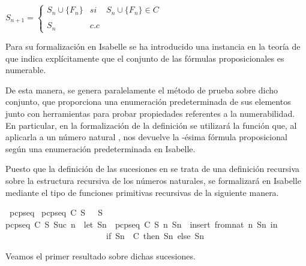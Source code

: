 \begin{isabellebody}
\begin{isamarkuptext}
\begin{definicion}
  $S_{n+1} = \left\{ \begin{array}{lcc} S_{n} \cup \{F_{n}\} &  si  & S_{n} \cup \{F_{n}\} \in C \\ \\ S_{n} & c.c \end{array} \right.$ 
\end{definicion}

  Para su formalización en Isabelle se ha introducido una instancia en la teoría de  que 
  indica explícitamente que el conjunto de las fórmulas proposicionales es numerable.


  De esta manera, se genera paralelamente el método de prueba  sobre dicho 
  conjunto, que proporciona una enumeración predeterminada de sus elementos junto con herramientas 
  para probar propiedades referentes a la numerabilidad. En particular, en la formalización de la
  definición  se utilizará la función  que, al aplicarla a un número natural , 
  nos devuelve la -ésima fórmula proposicional según una enumeración predeterminada en Isabelle. 

  Puesto que la definición de las sucesiones en  se trata de una definición 
  recursiva sobre la estructura recursiva de los números naturales, se formalizará en Isabelle
  mediante el tipo de funciones primitivas recursivas de la siguiente manera.%
\end{isamarkuptext}\isamarkuptrue%
\isamarkupfalse%
\ pcp{\isacharunderscore}seq\ \isanewline
{\isachardoublequoteopen}pcp{\isacharunderscore}seq\ C\ S\ {}\ {\isacharequal}\ S{\isachardoublequoteclose}\ {\isacharbar}\isanewline
{\isachardoublequoteopen}pcp{\isacharunderscore}seq\ C\ S\ {\isacharparenleft}Suc\ n{\isacharparenright}\ {\isacharequal}\ {\isacharparenleft}let\ Sn\ {\isacharequal}\ pcp{\isacharunderscore}seq\ C\ S\ n{\isacharsemicolon}\ Sn{}\ {\isacharequal}\ insert\ {\isacharparenleft}from{\isacharunderscore}nat\ n{\isacharparenright}\ Sn\ in\isanewline
\ \ \ \ \ \ \ \ \ \ \ \ \ \ \ \ \ \ \ \ \ \ \ \ if\ Sn{}\ {\isasymin}\ C\ then\ Sn{}\ else\ Sn{\isacharparenright}{\isachardoublequoteclose}%
\begin{isamarkuptext}%
Veamos el primer resultado sobre dichas sucesiones.


\end{isamarkuptext}
\end{isabellebody}
